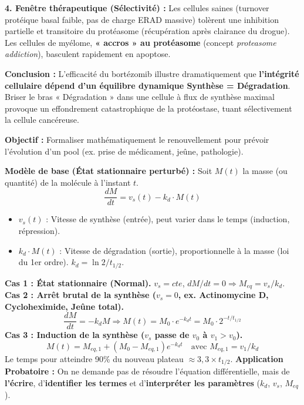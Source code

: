 \documentclass[11pt]{article}
\begin{document}
\begin{exoresolu}
\textbf{4. Fenêtre thérapeutique (Sélectivité) :}
Les cellules saines (turnover protéique basal faible, pas de charge ERAD massive) tolèrent une inhibition partielle et transitoire du protéasome (récupération après clairance du drogue). Les cellules de myélome, \textbf{« accros » au protéasome} (concept \emph{proteasome addiction}), basculent rapidement en apoptose.

\textbf{Conclusion :} L'efficacité du bortézomib illustre dramatiquement que \textbf{l'intégrité cellulaire dépend d'un équilibre dynamique Synthèse = Dégradation}. Briser le bras « Dégradation » dans une cellule à flux de synthèse maximal provoque un effondrement catastrophique de la protéostase, tuant sélectivement la cellule cancéreuse.
\end{exoresolu}

\begin{methode}
\textbf{Objectif :} Formaliser mathématiquement le renouvellement pour prévoir l'évolution d'un pool (ex. prise de médicament, jeûne, pathologie).
\par
\textbf{Modèle de base (État stationnaire perturbé) :}
Soit $M(t)$ la masse (ou quantité) de la molécule à l'instant $t$.
\[ \frac{dM}{dt} = v_s(t) - k_d \cdot M(t) \]
\begin{itemize}
    \item $v_s(t)$ : Vitesse de synthèse (entrée), peut varier dans le temps (induction, répression).
    \item $k_d \cdot M(t)$ : Vitesse de dégradation (sortie), proportionnelle à la masse (loi du 1er ordre). $k_d = \ln 2 / t_{1/2}$.
\end{itemize}
\textbf{Cas 1 : État stationnaire (Normal).} $v_s = cte$, $dM/dt = 0 \Rightarrow M_{eq} = v_s / k_d$.
\textbf{Cas 2 : Arrêt brutal de la synthèse ($v_s = 0$, ex. Actinomycine D, Cycloheximide, Jeûne total).}
\[ \frac{dM}{dt} = -k_d M \Rightarrow M(t) = M_0 \cdot e^{-k_d t} = M_0 \cdot 2^{-t/t_{1/2}} \]
\textbf{Cas 3 : Induction de la synthèse ($v_s$ passe de $v_0$ à $v_1 > v_0$).}
\[ M(t) = M_{eq,1} + (M_0 - M_{eq,1}) e^{-k_d t} \quad \text{avec } M_{eq,1} = v_1/k_d \]
Le temps pour atteindre 90\% du nouveau plateau $\approx 3{,}3 \times t_{1/2}$.
\textbf{Application Probatoire :} On ne demande pas de résoudre l'équation différentielle, mais de \textbf{l'écrire}, d'\textbf{identifier les termes} et d'\textbf{interpréter les paramètres} ($k_d$, $v_s$, $M_{eq}$).
\end{methode}
\end{document}

